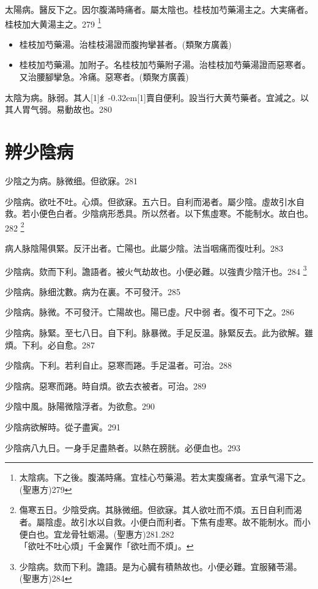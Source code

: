 \documentclass[11pt,oneside,b5paper]{ctexbook}
\begin{document}
\begin{flushleft}
[本]太陽病。醫反下之。因尔腹滿時痛者。屬太陰也。桂枝加芍藥湯主之。大実痛者。桂枝加大黄湯主之。279
\footnote{太陰病。下之後。腹滿時痛。宜桂心芍藥湯。若太実腹痛者。宜承气湯下之。(聖惠方)279}

\begin{itemize}
\item 桂枝加芍藥湯。治桂枝湯證而腹拘攣甚者。(類聚方廣義)
\item 桂枝加芍藥湯。加附子。名桂枝加芍藥附子湯。治桂枝加芍藥湯證而惡寒者。又治腰腳攣急。冷痛。惡寒者。(類聚方廣義)
\end{itemize}

太陰为病。脉弱。其人{\hbox{\scalebox{0.6}[1]{纟}\kern-0.32em\scalebox{0.7}[1]{賣}}}自便利。設当行大黄芍藥者。宜減之。以其人胃气弱。易動故也。280

\chapter{辨少陰病}

少陰之为病。脉微细。但欲寐。281

少陰病。欲吐不吐。心煩。但欲寐。五六日。自利而渴者。屬少陰。虛故引水自救。若小便色白者。少陰病形悉具。所以然者。以下焦虛寒。不能制水。故白也。282
\footnote{傷寒五日。少陰受病。其脉微细。但欲寐。其人欲吐而不煩。五日自利而渴者。屬陰虛。故引水以自救。小便白而利者。下焦有虛寒。故不能制水。而小便白也。宜龙骨牡蛎湯。(聖惠方)281.282\\「欲吐不吐心煩」千金翼作「欲吐而不煩」。}

病人脉陰陽俱緊。反汗出者。亡陽也。此屬少陰。法当咽痛而復吐利。283

少陰病。欬而下利。譫語者。被火气劫故也。小便必難。以強責少陰汗也。284
\footnote{少陰病。欬而下利。譫語。是为心臓有積熱故也。小便必難。宜服豬苓湯。(聖惠方)284}

少陰病。脉细沈數。病为在裏。不可發汗。285

少陰病。脉微。不可發汗。亡陽故也。陽已虛。尺中弱{𬈧}者。復不可下之。286

少陰病。脉緊。至七八日。自下利。脉暴微。手足反温。脉緊反去。此为欲解。雖煩。下利。必自愈。287

少陰病。下利。若利自止。惡寒而踡。手足温者。可治。288

少陰病。惡寒而踡。時自煩。欲去衣被者。可治。289

少陰中風。脉陽微陰浮者。为欲愈。290

少陰病欲解時。從子盡寅。291

少陰病八九日。一身手足盡熱者。以熱在膀胱。必便血也。293


\end{flushleft}
\end{document}
